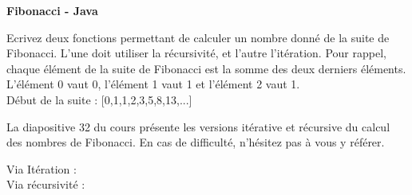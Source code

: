     \begin{Exercice}[15 minutes] \textbf{Fibonacci - Java} 

Ecrivez deux fonctions permettant de calculer un nombre donné de la suite de Fibonacci. L'une doit utiliser la récursivité, et l'autre l'itération. Pour rappel, chaque élément de la suite de Fibonacci est la somme des deux derniers éléments. L'élément 0 vaut 0, l'élément 1 vaut 1 et l'élément 2 vaut 1. \\

Début de la suite : [0,1,1,2,3,5,8,13,...]
    

    \begin{conseil} 
        La diapositive 32 du cours présente les versions itérative et récursive du calcul des nombres de Fibonacci. En cas de difficulté, n'hésitez pas à vous y référer.
    \end{conseil} 

    \begin{solution}
        Via Itération : \\
        
            
            
        Via récursivité : \\
        
            
    \end{solution} 

    \end{Exercice}


